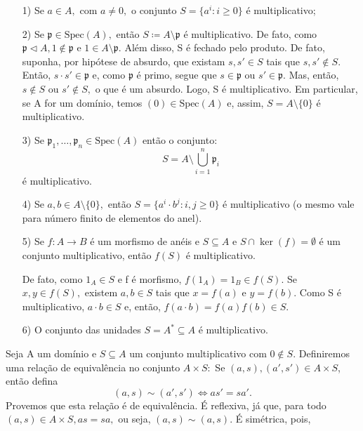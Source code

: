 \documentclass[algebraII_notes.tex]{subfiles}
\begin{document}
\begin{example}
	\begin{itemize}
		\item[1)] Se \(a\in A,\) com \(a\neq 0,\) o conjunto \(S = \{a^{i}: i\geq 0\}\) é multiplicativo;
		\item[2)] Se \(\mathfrak{p}\in \mathrm{Spec}(A),\) então \(S\coloneqq A\setminus{\mathfrak{p}}\) é multiplicativo. De fato, como
		      \(\mathfrak{p}\vartriangleleft A, 1\not\in \mathfrak{p}\) e \(1\in A\setminus{\mathfrak{p}}.\)
		      Além disso, S é fechado pelo produto. De fato, suponha, por hipótese de absurdo, que existam \(s, s'\in S\) tais que \(s, s'\not\in S.\) Então,
		      \(s \cdot s'\in \mathfrak{p}\) e, como \(\mathfrak{p}\) é primo, segue que \(s\in \mathfrak{p}\) ou \(s'\in \mathfrak{p}.\) Mas, então, \(s\not\in S\) ou
		      \(s'\not\in S,\) o que é um absurdo. Logo, S é multiplicativo. Em particular, se A for um domínio, temos \((0)\in \mathrm{Spec}(A)\) e, assim,
		      \(S=A\setminus{\{0\}}\) é multiplicativo.
		\item[3)] Se \(\mathfrak{p}_{1}, \dotsc , \mathfrak{p}_{n}\in \mathrm{Spec}(A)\) então o conjunto:
		      \[
			      S = A\setminus{\bigcup_{i=1}^{n}\mathfrak{p}_{i}}
		      \]
		      é multiplicativo.
		\item[4)] Se \(a, b\in A \setminus{\{0\}},\) então \(S = \{a^{i}\cdot b^{j}: i, j\geq 0\}\) é multiplicativo (o mesmo vale para número finito de
		      elementos do anel).
		\item[5)] Se \(f:A\rightarrow B\) é um morfismo de anéis e \(S\subseteq A\) e \(S\cap \ker{(f)} = \emptyset\) é um conjunto multiplicativo,
		      então \(f(S)\) é multiplicativo.

		      De fato, como \(1_{A}\in S\) e f é morfismo, \(f(1_{A}) = 1_{B}\in f(S).\) Se \(x, y\in f(S),\) existem
		      \(a, b\in S\) tais que \(x=f(a)\) e \(y=f(b).\) Como S é multiplicativo, \(a \cdot b\in S\) e, então, \(f(a \cdot b) = f(a)f(b)\in S.\)
		\item[6)] O conjunto das unidades \(S = A^{*}\subseteq A\) é multiplicativo.
	\end{itemize}
\end{example}
Seja A um domínio e \(S\subseteq A\) um conjunto multiplicativo com \(0\not\in S.\) Definiremos uma relação de equivalência no conjunto
\(A\times S:\) Se \((a, s), (a', s')\in A\times S\), então defina
\[
	(a, s)\sim (a', s') \Longleftrightarrow as' = sa'.
\]
Provemos que esta relação é de equivalência. É reflexiva, já que, para todo
\((a, s)\in A\times S, as = sa,\) ou seja, \((a, s)\sim (a, s).\) É simétrica, pois,
\end{document}
